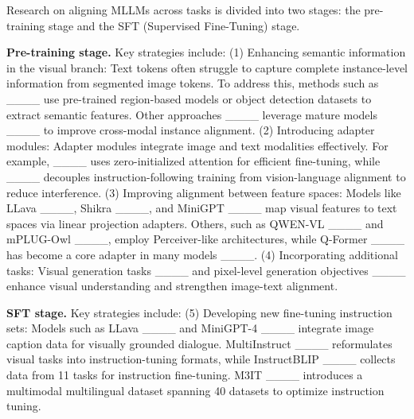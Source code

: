 Research on aligning MLLMs across tasks is divided into two stages: the pre-training stage and the SFT (Supervised Fine-Tuning) stage. 

\textbf{Pre-training stage.} Key strategies include:  
(1) Enhancing semantic information in the visual branch: Text tokens often struggle to capture complete instance-level information from segmented image tokens. To address this, methods such as ____ use pre-trained region-based models or object detection datasets to extract semantic features. Other approaches ____ leverage mature models ____ to improve cross-modal instance alignment.  
(2) Introducing adapter modules: Adapter modules integrate image and text modalities effectively. For example, ____ uses zero-initialized attention for efficient fine-tuning, while ____ decouples instruction-following training from vision-language alignment to reduce interference.  
(3) Improving alignment between feature spaces: Models like LLava ____, Shikra ____, and MiniGPT ____ map visual features to text spaces via linear projection adapters. Others, such as QWEN-VL ____ and mPLUG-Owl ____, employ Perceiver-like architectures, while Q-Former ____ has become a core adapter in many models ____.  
(4) Incorporating additional tasks: Visual generation tasks ____ and pixel-level generation objectives ____ enhance visual understanding and strengthen image-text alignment.  

\textbf{SFT stage.} Key strategies include:  
(5) Developing new fine-tuning instruction sets: Models such as LLava ____ and MiniGPT-4 ____ integrate image caption data for visually grounded dialogue. MultiInstruct ____ reformulates visual tasks into instruction-tuning formats, while InstructBLIP ____ collects data from 11 tasks for instruction fine-tuning. 
M3IT ____ introduces a multimodal multilingual dataset spanning 40 datasets to optimize instruction tuning.